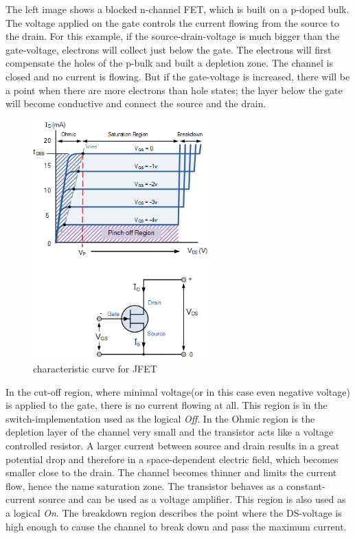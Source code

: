 \documentclass[11pt]{article}
\begin{document}
The left image shows a blocked n-channel FET, which is built on a p-doped bulk. The voltage applied on the gate controls the current flowing from the source to the drain. For this example, if the source-drain-voltage is much bigger than the gate-voltage, electrons will collect just below the gate. The electrons will first compensate the holes of the p-bulk and built a depletion zone. The channel is closed and no current is flowing. But if the gate-voltage is increased, there will be a point when there are more electrons than hole states; the layer below the gate will become conductive and connect the source and the drain. 

\begin{figure}[H]
\centering
\includegraphics[width=0.6\textwidth]{kenn_jfet.png}%
\caption{characteristic curve for JFET}
\label{fig:kenn_jfet}
\end{figure}

In the cut-off region, where minimal voltage(or in this case even negative voltage) is applied to the gate, there is no current flowing at all. This region is in the switch-implementation used as the logical \textit{Off}. 
In the Ohmic region is the depletion layer of the channel very small and the transistor acts like a voltage controlled resistor. 
A larger current between source and drain results in a great potential drop and therefore in a space-dependent electric field, which becomes smaller close to the drain. The channel becomes thinner and limits the current flow, hence the name saturation zone. The transistor behaves as a constant-current source and can be used as a voltage amplifier. This region is also used as a logical \textit{On}. 
The breakdown region describes the point where the DS-voltage is high enough to cause the channel to break down and pass the maximum current. 
\end{document}
